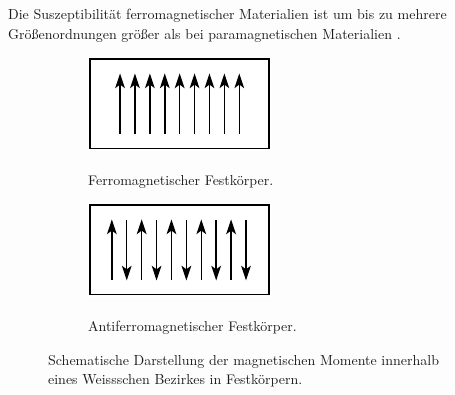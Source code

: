 \documentclass[page,pdftex,12pt,a4paper,twoside,openright]{scrbook}
\begin{document}
Die Suszeptibilität ferromagnetischer Materialien ist um bis zu mehrere Größenordnungen größer als bei paramagnetischen Materialien \cite{demtroder_experimentalphysik_2017}.

\begin{figure}[h]
\centering
\begin{subfigure}[b]{0.3\textwidth}
\caption{Ferromagnetischer Festkörper.}
\includegraphics[width=\textwidth]{./img/ferro.pdf}
\label{fig-ferro}
\end{subfigure}
\quad
\begin{subfigure}[b]{0.3\textwidth}
\caption{Antiferromagnetischer Festkörper.}
\includegraphics[width=\textwidth]{./img/antiferro.pdf}
\label{fig-antiferro}
\end{subfigure}
\caption{Schematische Darstellung der magnetischen Momente innerhalb eines Weissschen Bezirkes in Festkörpern.}
\end{figure}
\end{document}
